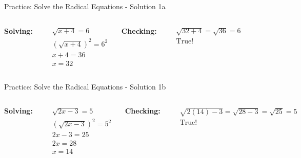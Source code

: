 \documentclass[aspectratio=169]{beamer}
\begin{document}
\begin{frame}{Practice: Solve the Radical Equations - Solution 1a}
\begin{tcolorbox}[colback=lightgray,colframe=primary,title=Solution 1a]
\footnotesize
\begin{columns}[T]
\textbf{Solving:}

\begin{align*}
  &\sqrt{x+4} = 6 \\
  &(\sqrt{x+4})^2 = 6^2 \\
  &x+4 = 36 \\
  &x = 32
\end{align*}

\textbf{Checking:}

\begin{align*}
  &\sqrt{32+4} = \sqrt{36} = 6 \\
  &\text{True!}
\end{align*}
\end{columns}
\end{tcolorbox}
\end{frame}

\begin{frame}{Practice: Solve the Radical Equations - Solution 1b}
\begin{tcolorbox}[colback=lightgray,colframe=primary,title=Solution 1b]
\footnotesize
\begin{columns}[T]
\textbf{Solving:}

\begin{align*}
  &\sqrt{2x-3} = 5 \\
  &(\sqrt{2x-3})^2 = 5^2 \\
  &2x-3 = 25 \\
  &2x = 28 \\
  &x = 14
\end{align*}

\textbf{Checking:}

\begin{align*}
  &\sqrt{2(14)-3} = \sqrt{28-3} = \sqrt{25} = 5 \\
  &\text{True!}
\end{align*}
\end{columns}
\end{tcolorbox}
\end{frame}
\end{document}
